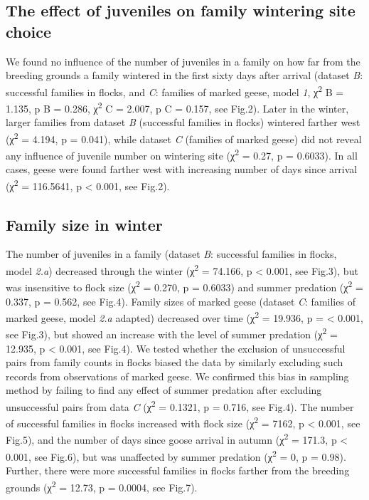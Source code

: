 \documentclass[10pt,twocolumn]{paper}
\begin{document}
\subsection{The effect of juveniles on family wintering site
choice}\label{the-effect-of-juveniles-on-family-wintering-site-choice}

We found no influence of the number of juveniles in a family on how far
from the breeding grounds a family wintered in the first sixty days
after arrival (dataset \emph{B}: successful families in flocks, and
\emph{C}: families of marked geese, model \emph{1}, χ\textsuperscript{2}
B = 1.135, p B = 0.286, χ\textsuperscript{2} C = 2.007, p C = 0.157, see
Fig.2). Later in the winter, larger families from dataset \emph{B}
(successful families in flocks) wintered farther west
(χ\textsuperscript{2} = 4.194, p = 0.041), while dataset \emph{C}
(families of marked geese) did not reveal any influence of juvenile
number on wintering site (χ\textsuperscript{2} = 0.27, p = 0.6033). In
all cases, geese were found farther west with increasing number of days
since arrival (χ\textsuperscript{2} = 116.5641, p \textless{} 0.001, see
Fig.2).

\subsection{Family size in winter}\label{family-size-in-winter}

The number of juveniles in a family (dataset \emph{B}: successful
families in flocks, model \emph{2.a}) decreased through the winter
(χ\textsuperscript{2} = 74.166, p \textless{} 0.001, see Fig.3), but was
insensitive to flock size (χ\textsuperscript{2} = 0.270, p = 0.6033) and
summer predation (χ\textsuperscript{2} = 0.337, p = 0.562, see Fig.4).
Family sizes of marked geese (dataset \emph{C}: families of marked
geese, model \emph{2.a} adapted) decreased over time
(χ\textsuperscript{2} = 19.936, p = \textless{} 0.001, see Fig.3), but
showed an increase with the level of summer predation
(χ\textsuperscript{2} = 12.935, p \textless{} 0.001, see Fig.4). We
tested whether the exclusion of unsuccessful pairs from family counts in
flocks biased the data by similarly excluding such records from
observations of marked geese. We confirmed this bias in sampling method
by failing to find any effect of summer predation after excluding
unsuccessful pairs from data \emph{C} (χ\textsuperscript{2} = 0.1321, p
= 0.716, see Fig.4). The number of successful families in flocks
increased with flock size (χ\textsuperscript{2} = 7162, p \textless{}
0.001, see Fig.5), and the number of days since goose arrival in autumn
(χ\textsuperscript{2} = 171.3, p \textless{} 0.001, see Fig.6), but was
unaffected by summer predation (χ\textsuperscript{2} = 0, p = 0.98).
Further, there were more successful families in flocks farther from the
breeding grounds (χ\textsuperscript{2} = 12.73, p = 0.0004, see Fig.7).
\end{document}
